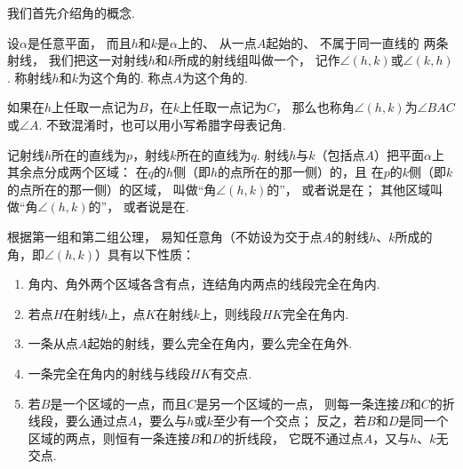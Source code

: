 我们首先介绍角的概念.
\begin{definition}\label{definition:欧式几何.几何元素.角}
设\(\alpha\)是任意平面，%
而且\(h\)和\(k\)是\(\alpha\)上的、%
从一点\(A\)起始的、%
不属于同一直线的%
两条射线，%
我们把这一对射线\(h\)和\(k\)所成的射线组叫做一个，%
记作\(\angle(h,k)\)或\(\angle(k,h)\).
称射线\(h\)和\(k\)为这个角的.
称点\(A\)为这个角的.

如果在\(h\)上任取一点记为\(B\)，在\(k\)上任取一点记为\(C\)，%
那么也称角\(\angle(h,k)\)为\(\angle BAC\)或\(\angle A\).
不致混淆时，也可以用小写希腊字母表记角.

记射线\(h\)所在的直线为\(p\)，射线\(k\)所在的直线为\(q\).
射线\(h\)与\(k\)（包括点\(A\)）把平面\(\alpha\)上其余点分成两个区域：
在\(q\)的\(h\)侧（即\(h\)的点所在的那一侧）的，且%
在\(p\)的\(k\)侧（即\(k\)的点所在的那一侧）的区域，%
叫做“角\(\angle(h,k)\)的”，%
或者说是在；
其他区域叫做“角\(\angle(h,k)\)的”，%
或者说是在.
\end{definition}

\begin{property}
根据第一组和第二组公理，%
易知任意角（不妨设为交于点\(A\)的射线\(h\)、\(k\)所成的角，即\(\angle(h,k)\)）具有以下性质：
\begin{enumerate}
\item 角内、角外两个区域各含有点，连结角内两点的线段完全在角内.
\item 若点\(H\)在射线\(h\)上，点\(K\)在射线\(k\)上，则线段\(HK\)完全在角内.
\item 一条从点\(A\)起始的射线，要么完全在角内，要么完全在角外.
\item 一条完全在角内的射线与线段\(HK\)有交点.
\item 若\(B\)是一个区域的一点，而且\(C\)是另一个区域的一点，%
则每一条连接\(B\)和\(C\)的折线段，要么通过点\(A\)，要么与\(h\)或\(k\)至少有一个交点；
反之，若\(B\)和\(D\)是同一个区域的两点，则恒有一条连接\(B\)和\(D\)的折线段，%
它既不通过点\(A\)，又与\(h\)、\(k\)无交点.
\end{enumerate}
\end{property}


